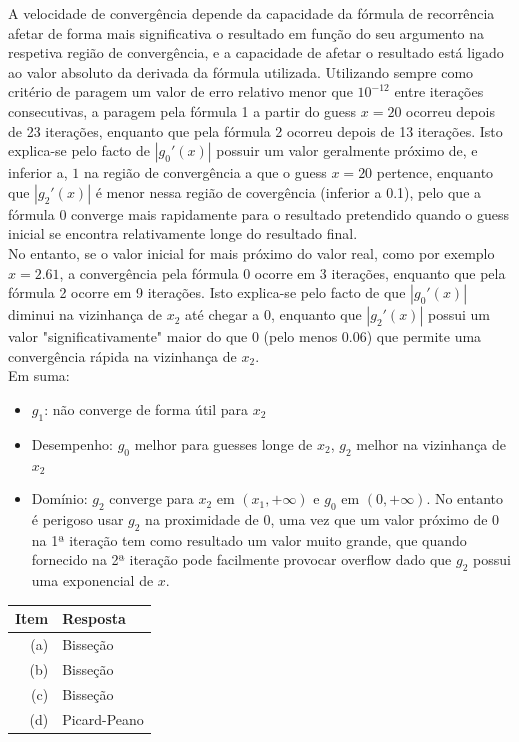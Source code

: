 \documentclass{mnum}
\begin{document}
A velocidade de convergência depende da capacidade da fórmula de recorrência afetar de forma mais significativa o resultado em função do seu argumento na respetiva região de convergência, e a capacidade de afetar o resultado está ligado ao valor absoluto da derivada da fórmula utilizada.
Utilizando sempre como critério de paragem um valor de erro relativo menor que $10^{-12}$ entre iterações consecutivas, a paragem pela fórmula 1 a partir do guess $x=20$ ocorreu depois de 23 iterações, enquanto que pela fórmula 2 ocorreu depois de 13 iterações. Isto explica-se pelo facto de $|g_0'(x)|$ possuir um valor geralmente próximo de, e inferior a, $1$ na região de convergência a que o guess $x=20$ pertence, enquanto que $|g_2'(x)|$ é menor nessa região de covergência (inferior a 0.1), pelo que a fórmula 0 converge mais rapidamente para o resultado pretendido quando o guess inicial se encontra relativamente longe do resultado final.\\
No entanto, se o valor inicial for mais próximo do valor real, como por exemplo $x=2.61$, a convergência pela fórmula 0 ocorre em 3 iterações, enquanto que pela fórmula 2 ocorre em 9 iterações. Isto explica-se pelo facto de que $|g_0'(x)|$ diminui na vizinhança de $x_2$ até chegar a $0$, enquanto que $|g_2'(x)|$ possui um valor "significativamente" maior do que $0$ (pelo menos 0.06) que permite uma convergência rápida na vizinhança de $x_2$.\\
Em suma:
\begin{itemize}
	\item $g_1$: não converge de forma útil para $x_2$
	\item Desempenho: $g_0$ melhor para guesses longe de $x_2$, $g_2$ melhor na vizinhança de $x_2$
	\item Domínio: $g_2$ converge para $x_2$ em $(x_1,+\infty)$ e $g_0$ em $(0,+\infty)$. No entanto é perigoso usar $g_2$ na proximidade de $0$, uma vez que um valor próximo de $0$ na 1ª iteração tem como resultado um valor muito grande, que quando fornecido na 2ª iteração pode facilmente provocar overflow dado que $g_2$ possui uma exponencial de $x$.
\end{itemize}
\begin{center} \begin{tabular}{r | l}
	\textbf{Item} & \textbf{Resposta} \\ \hline
	(a) & Bisseção \\
	(b) & Bisseção \\
	(c) & Bisseção \\
	(d) & Picard-Peano
\end{tabular} \end{center}
\end{document}
